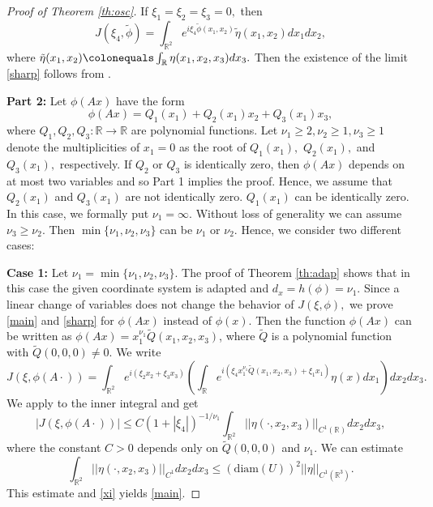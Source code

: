 \documentclass[a4paper, 11pt]{article}
\theoremstyle{plain}
\theoremstyle{definition}
\theoremstyle{lemma}
\theoremstyle{Remark}
\theoremstyle{proposition}
\theoremstyle{corollary}
\theoremstyle{example}
\theoremstyle{assumption}
\begin{document}
\begin{proof}[Proof of Theorem \ref{th:osc}]
If $\xi_1=\xi_2=\xi_3=0,$ then
$$
J(\xi_4,\tilde{\phi})=\int_{\mathbb{R}^2}e^{i\xi_4\tilde{\phi}(x_1,x_2) } \tilde{\eta}(x_1,x_2)dx_1dx_2
,
$$
where $\tilde{\eta}(x_1,x_2)\colonequals \int_{\mathbb{R}}\eta(x_1,x_2,x_3)
dx_3.$
Then the existence of  the limit \eqref{sharp}  follows from \cite[Theorem 0.6]{Var}.


\bigskip
\textbf{Part 2:} Let
$ \phi(Ax)$ have the form
$$\phi(Ax)=Q_1(x_1)+Q_2(x_1)x_2+Q_3(x_1)x_3,$$
where $Q_1, Q_2, Q_3:\mathbb{R}\to \mathbb{R}$ are polynomial functions.
Let $\nu_1\geq 2,\nu_2\geq 1,\nu_3\geq 1$  denote the multiplicities of $x_1=0$ as the root of    $Q_1(x_1),$ $Q_2(x_1),$ and $Q_3(x_1),$ respectively.  If  $Q_2$ or  $Q_3$ is identically zero, then $\phi(Ax)$ depends on at most two variables and so Part 1  implies the proof. Hence, we assume that $Q_2(x_1)$ and $Q_3(x_1)$ are not identically zero. $Q_1(x_1)$ can be identically zero. In this case, we formally put $\nu_1=\infty$. Without loss of generality we can assume $\nu_3\geq \nu_2.$  Then  $\min\{\nu_1,\nu_2,\nu_3\}$  can be $\nu_1$ or $\nu_2.$
Hence, we consider two different cases:


\textbf{Case 1:} Let $\nu_1= \min\{\nu_1,\nu_2,\nu_3\}.$
 The proof of Theorem \ref{th:adap} shows that in this case the given coordinate system is adapted
and  $d_x=h(\phi)=\nu_1.$ Since a linear change of variables does not change the behavior of $J(\xi, \phi),$ we prove \eqref{main} and \eqref{sharp} for $\phi(Ax)$ instead of $\phi(x).$ Then the function $\phi(Ax)$ can be written as $\phi(Ax)=x_1^{\nu_1}\tilde Q(x_1, x_2, x_3)$, where $\tilde Q$ is a polynomial function with $\tilde Q(0, 0, 0)\neq0$.   We write
\begin{equation*}
J(\xi, \phi(A\cdot))=\int_{\mathbb{R}^2}e^{i(\xi_2x_2+\xi_3x_3)}\left( \int_{\mathbb{R}}e^{i(\xi_4x_1^{\nu_1}\tilde Q(x_1, x_2, x_3)+\xi_1x_1)} {\eta}(x)dx_1\right)dx_2dx_3.
\end{equation*}
 We apply \cite[Lemma 2.2]{Ik.Mu}  to the inner integral and get
$$|J(\xi, \phi(A\cdot))|\leq  C (1+|\xi_4|)^{-1/\nu_1} \int_{\mathbb{R}^2}||\eta( \cdot,x_2,x_3)||_{C^1(\mathbb{R})}dx_2dx_3  ,$$
where the constant $C>0$ depends only on $\tilde Q(0, 0, 0)$ and $\nu_1.$ We can estimate
$$\int_{\mathbb{R}^2}||\eta(\cdot, x_2,x_3)||_{C^1}dx_2dx_3\leq (\mathrm{diam}(U))^2||\eta||_{C^1(\mathbb{R}^3)}.$$
This estimate and \eqref{xi} yields \eqref{main}.


\end{proof}
\end{document}

